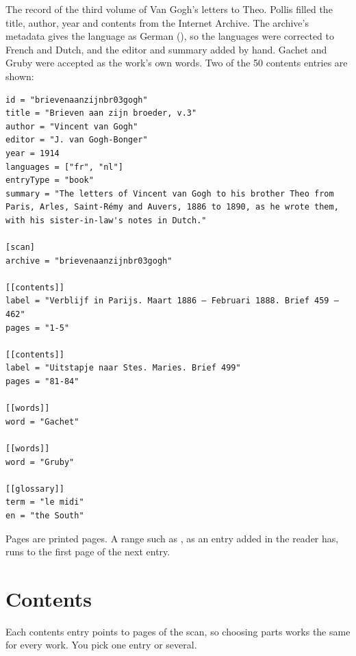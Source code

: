 The record of the third volume of Van Gogh's letters to Theo. Pollis filled the title, author, year and contents
from the Internet Archive. The archive's metadata gives the language as German (), so the languages were
corrected to French and Dutch, and the editor and summary added by hand. Gachet and Gruby were accepted as the work's
own words. Two of the 50 contents entries are shown:
\begin{lstlisting}
id = "brievenaanzijnbr03gogh"
title = "Brieven aan zijn broeder, v.3"
author = "Vincent van Gogh"
editor = "J. van Gogh-Bonger"
year = 1914
languages = ["fr", "nl"]
entryType = "book"
summary = "The letters of Vincent van Gogh to his brother Theo from Paris, Arles, Saint-Rémy and Auvers, 1886 to 1890, as he wrote them, with his sister-in-law's notes in Dutch."

[scan]
archive = "brievenaanzijnbr03gogh"

[[contents]]
label = "Verblijf in Parijs. Maart 1886 — Februari 1888. Brief 459 — 462"
pages = "1-5"

[[contents]]
label = "Uitstapje naar Stes. Maries. Brief 499"
pages = "81-84"

[[words]]
word = "Gachet"

[[words]]
word = "Gruby"

[[glossary]]
term = "le midi"
en = "the South"
\end{lstlisting}
Pages are printed pages. A range such as , as an entry added in the reader has, runs to the first page of
the next entry.

\section{Contents}\label{sec:contents}
Each contents entry points to pages of the scan, so choosing parts works the same for every work. You pick one entry or
several.

